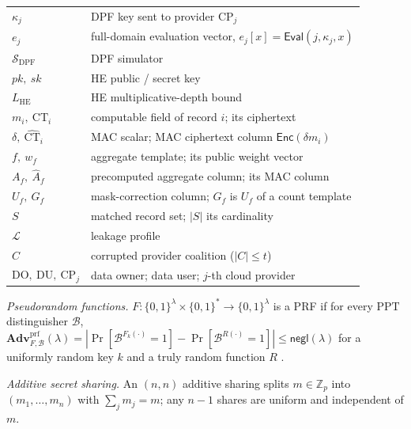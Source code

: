 \documentclass[a4paper,fleqn]{cas-dc}
\newcommand{\negl}{\mathsf{negl}}
\newcommand{\PPT}{\mathrm{PPT}}
\newcommand{\Leak}{\mathcal{L}}
\newcommand{\Sim}{\mathcal{S}}
\newcommand{\Eval}{\mathsf{Eval}}
\newcommand{\Enc}{\mathsf{Enc}}
\newcommand{\advPRF}{\mathbf{Adv}^{\mathrm{prf}}}
\begin{document}
\begin{table}[pos=t]
\begin{tabular}{@{}l>{\raggedright\arraybackslash}p{5.5cm}@{}}
$\kappa_j$ & DPF key sent to provider $\text{CP}_j$ \\
$e_j$ & full-domain evaluation vector, $e_j[x]=\Eval(j,\kappa_j,x)$ \\
$\Sim_{\mathrm{DPF}}$ & DPF simulator \\
$pk,\ sk$ & HE public / secret key \\
$L_{\mathrm{HE}}$ & HE multiplicative-depth bound \\
$m_i,\ \text{CT}_i$ & computable field of record $i$; its ciphertext \\
$\delta,\ \widehat{\text{CT}}_i$ & MAC scalar; MAC ciphertext column
$\Enc(\delta m_i)$ \\
$f,\ w_f$ & aggregate template; its public weight vector \\
$A_f,\ \widehat{A}_f$ & precomputed aggregate column; its MAC column \\
$U_f,\ G_f$ & mask-correction column; $G_f$ is $U_f$ of a count template \\
$S$ & matched record set; $|S|$ its cardinality \\
$\Leak$ & leakage profile \\
$C$ & corrupted provider coalition ($|C|\le t$) \\
$\mathrm{DO,\ DU},\ \text{CP}_j$ & data owner; data user; $j$-th cloud
provider \\
\bottomrule
\end{tabular}
\end{table}

\emph{Pseudorandom functions.} $F:\{0,1\}^\lambda\times\{0,1\}^*\!\to\!
\{0,1\}^\lambda$ is a PRF if for every $\PPT$ distinguisher $\mathcal{B}$,
$\advPRF_{F,\mathcal{B}}(\lambda)=|\Pr[\mathcal{B}^{F_k(\cdot)}=1]-
\Pr[\mathcal{B}^{R(\cdot)}=1]|\le\negl(\lambda)$ for a uniformly random key
$k$ and a truly random function $R$ \citep{goldreich2019construct}.

\emph{Additive secret sharing.} An $(n,n)$ additive sharing splits
$m\in\mathbb{Z}_p$ into $(m_1,\dots,m_n)$ with $\sum_j m_j=m$; any $n-1$
shares are uniform and independent of $m$.
\end{document}
